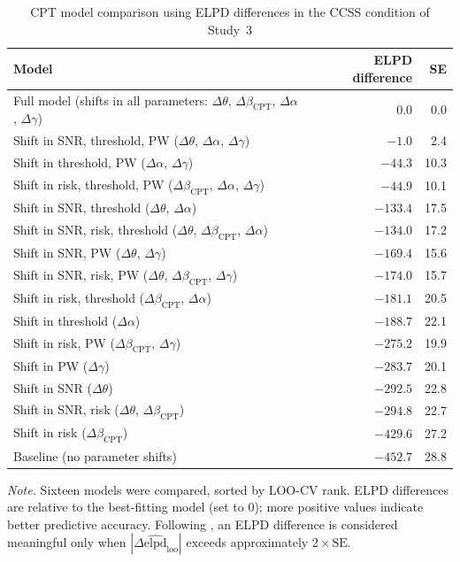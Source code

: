 \documentclass[man,floatsintext]{apa7}
\begin{document}
\begin{table}[!htbp]
\centering
\begin{threeparttable}\small
\caption{CPT model comparison using ELPD differences in the CCSS condition of Study~3}
\label{tab:cpt_mc_ccss_study3}
\begin{tabularx}{\linewidth}{@{} >{\raggedright\arraybackslash}X rr @{}}
\toprule
\textbf{Model} & \textbf{ELPD difference} & \textbf{SE} \\
\midrule
Full model (shifts in all parameters: $\Delta\theta$, $\Delta\beta_{\text{CPT}}$, $\Delta\alpha$, $\Delta\gamma$) & 0.0 & 0.0 \\
Shift in SNR, threshold, PW ($\Delta\theta$, $\Delta\alpha$, $\Delta\gamma$) & $-1.0$ & 2.4 \\
Shift in threshold, PW ($\Delta\alpha$, $\Delta\gamma$) & $-44.3$ & 10.3 \\
Shift in risk, threshold, PW ($\Delta\beta_{\text{CPT}}$, $\Delta\alpha$, $\Delta\gamma$) & $-44.9$ & 10.1 \\
Shift in SNR, threshold ($\Delta\theta$, $\Delta\alpha$) & $-133.4$ & 17.5 \\
Shift in SNR, risk, threshold ($\Delta\theta$, $\Delta\beta_{\text{CPT}}$, $\Delta\alpha$) & $-134.0$ & 17.2 \\
Shift in SNR, PW ($\Delta\theta$, $\Delta\gamma$) & $-169.4$ & 15.6 \\
Shift in SNR, risk, PW ($\Delta\theta$, $\Delta\beta_{\text{CPT}}$, $\Delta\gamma$) & $-174.0$ & 15.7 \\
Shift in risk, threshold ($\Delta\beta_{\text{CPT}}$, $\Delta\alpha$) & $-181.1$ & 20.5 \\
Shift in threshold ($\Delta\alpha$) & $-188.7$ & 22.1 \\
Shift in risk, PW ($\Delta\beta_{\text{CPT}}$, $\Delta\gamma$) & $-275.2$ & 19.9 \\
Shift in PW ($\Delta\gamma$) & $-283.7$ & 20.1 \\
Shift in SNR ($\Delta\theta$) & $-292.5$ & 22.8 \\
Shift in SNR, risk ($\Delta\theta$, $\Delta\beta_{\text{CPT}}$) & $-294.8$ & 22.7 \\
Shift in risk ($\Delta\beta_{\text{CPT}}$) & $-429.6$ & 27.2 \\
Baseline (no parameter shifts) & $-452.7$ & 28.8 \\
\bottomrule
\end{tabularx}
\begin{tablenotes}
\item \textit{Note.} Sixteen models were compared, sorted by LOO-CV rank. ELPD differences are relative to the best-fitting model (set to 0); more positive values indicate better predictive accuracy. Following \textcite{vehtari_practical_2017}, an ELPD difference is considered meaningful only when $|\Delta\widehat{\mathrm{elpd}}_{\mathrm{loo}}|$ exceeds approximately $2 \times \mathrm{SE}$. 
\end{tablenotes}
\end{threeparttable}
\end{table}
\end{document}

